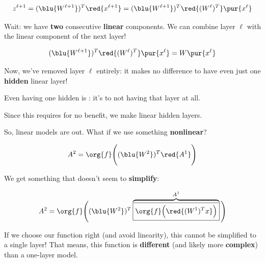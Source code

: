         \begin{equation}
            z^{\ell+1} = (\blu{W^{\ell+1}})^T\red{x^{\ell+1}} = 
            (\blu{W^{\ell+1}})^T \red{ (W^{\ell})^T } \pur{ x^{\ell} } 
        \end{equation}

        Wait: we have \textbf{two} consecutive \textbf{linear} components. We can combine layer $\ell$ with the linear component of the next layer! 

        \begin{equation}
            (\blu{W^{\ell+1}})^T \red{ (W^{\ell})^T } \pur{ x^{\ell} }  = W \pur{ x^{\ell} }
        \end{equation}
        
        Now, we've removed layer $\ell$ entirely: it makes no difference to have even just one \textbf{hidden} linear layer!\\

        \begin{concept}
            Even having one hidden  is : it's  to not having that layer at all.

            Since this requires  for no benefit, we  make linear hidden layers.
        \end{concept}

        So, linear models are out. What if we use something \textbf{nonlinear}?
        
        \begin{equation}
            A^2 = 
            \org{f}
            \Bigg( 
                (\blu{W^2})^T 
                \red{A^1}
            \Bigg)
        \end{equation}
        
        We get something that doesn't seem to \textbf{simplify}:
        
        \begin{equation}
            A^2 = 
            \org{f}
            \Bigg( 
                (\blu{W^2})^T 
                \overbrace{
                    \boxed{
                        \org{f}
                        \Big(
                            \red{ (W^1)^T x }
                        \Big)
                    }
                }^{A^1}
            \Bigg)
        \end{equation}

        If we choose our function right (and avoid linearity), this cannot be simplified to a single layer! That means, this function is \textbf{different} (and likely more \textbf{complex}) than a one-layer model. 
        
